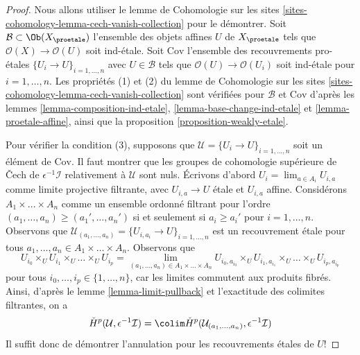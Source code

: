 \begin{proof}
Nous allons utiliser le
lemme de Cohomologie sur les sites \ref{sites-cohomology-lemma-cech-vanish-collection}
pour le démontrer. Soit $\mathcal{B} \subset \Ob(X_\proetale)$ l'ensemble des objets affines
$U$ de $X_\proetale$ tels que $\mathcal{O}(X) \to \mathcal{O}(U)$ soit
ind-\'etale. Soit $\text{Cov}$ l'ensemble des recouvrements pro-\'etales
$\{U_i \to U\}_{i = 1, \ldots, n}$ avec $U \in \mathcal{B}$ tels que
$\mathcal{O}(U) \to \mathcal{O}(U_i)$ soit ind-\'etale pour $i = 1, \ldots, n$.
Les propriétés (1) et (2) du
lemme de Cohomologie sur les sites \ref{sites-cohomology-lemma-cech-vanish-collection}
sont vérifiées pour $\mathcal{B}$ et $\text{Cov}$ d'après les
lemmes \ref{lemma-composition-ind-etale},
\ref{lemma-base-change-ind-etale} et
\ref{lemma-proetale-affine}, ainsi que la
proposition \ref{proposition-weakly-etale}.

\medskip\noindent
Pour vérifier la condition (3), supposons que
$\mathcal{U} = \{U_i \to U\}_{i = 1, \ldots, n}$
soit un élément de $\text{Cov}$. Il faut montrer que les groupes de
cohomologie supérieure de Čech de $\epsilon^{-1}\mathcal{I}$
relativement à $\mathcal{U}$ sont nuls.
Écrivons d'abord $U_i = \lim_{a \in A_i} U_{i, a}$ comme limite projective filtrante,
avec $U_{i, a} \to U$ \'etale et $U_{i, a}$ affine.
Considérons $A_1 \times \ldots \times A_n$ comme un ensemble ordonné filtrant
pour l'ordre $(a_1, \ldots, a_n) \geq (a_1', \ldots, a_n')$
si et seulement si $a_i \geq a_i'$ pour $i = 1, \ldots, n$.
Observons que
$\mathcal{U}_{(a_1, \ldots, a_n)} = \{U_{i, a_i} \to U\}_{i = 1, \ldots, n}$
est un recouvrement \'etale pour tous
$a_1, \ldots, a_n \in A_1 \times \ldots \times A_n$.
Observons que
$$
U_{i_0} \times_U U_{i_1} \times_U \ldots \times_U U_{i_p}
=
\lim_{(a_1, \ldots, a_n) \in A_1 \times \ldots \times A_n}
U_{i_0, a_{i_0}} \times_U
U_{i_1, a_{i_1}} \times_U \ldots \times_U U_{i_p, a_{i_p}}
$$
pour tous $i_0, \ldots, i_p \in \{1, \ldots, n\}$, car les limites
commutent aux produits fibrés. Ainsi, d'après le lemme \ref{lemma-limit-pullback}
et l'exactitude des colimites filtrantes, on a
$$
\check{H}^p(\mathcal{U}, \epsilon^{-1}\mathcal{I}) =
\colim \check{H}^p(\mathcal{U}_{(a_1, \ldots, a_n)}, \epsilon^{-1}\mathcal{I}) 
$$
Il suffit donc de démontrer l'annulation pour les recouvrements \'etales
de $U$!


\end{proof}
